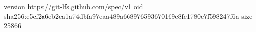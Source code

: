 version https://git-lfs.github.com/spec/v1
oid sha256:e5cf2a6eb2ca1a74dbfa97eaa489a668976593670169c8fe1780c7f598247f6a
size 25866

